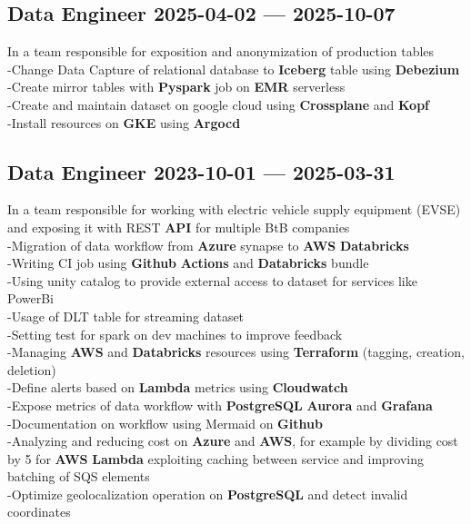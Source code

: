 \documentclass[10pt]{article}
\begin{document}
\subsection{{Data Engineer \hspace*{\fill} 2025-04-02 --- 2025-10-07}}
\smallskip
{}
\medskip
In a team responsible for exposition and anonymization of production tables\\
            -Change Data Capture of relational database to \textbf{Iceberg} table using \textbf{Debezium}\\
            -Create mirror tables with \textbf{Pyspark} job on \textbf{EMR} serverless\\
            -Create and maintain dataset on google cloud using \textbf{Crossplane} and \textbf{Kopf}\\
            -Install resources on \textbf{GKE} using \textbf{Argocd}
\medskip

\subsection{{Data Engineer \hspace*{\fill} 2023-10-01 --- 2025-03-31}}
\smallskip
{}
\medskip
In a team responsible for working with electric vehicle supply equipment (EVSE) and exposing
            it with REST \textbf{API} for multiple BtB companies\\
            -Migration of data workflow from \textbf{Azure} synapse to \textbf{AWS} \textbf{Databricks}\\
            -Writing CI job using \textbf{Github} \textbf{Actions} and \textbf{Databricks} bundle\\
            -Using unity catalog to provide external access to dataset for services like PowerBi\\
            -Usage of DLT table for streaming dataset\\
            -Setting test for spark on dev machines to improve feedback\\
            -Managing \textbf{AWS} and \textbf{Databricks} resources using \textbf{Terraform} (tagging, creation, deletion)\\
            -Define alerts based on \textbf{Lambda} metrics using \textbf{Cloudwatch}\\
            -Expose metrics of data workflow with \textbf{PostgreSQL} \textbf{Aurora} and \textbf{Grafana}\\
            -Documentation on workflow using Mermaid on \textbf{Github}\\
            -Analyzing and reducing cost on \textbf{Azure} and \textbf{AWS}, for example by  dividing cost by 5 for \textbf{AWS} \textbf{Lambda}
            exploiting caching between service and improving batching of SQS elements\\
            -Optimize geolocalization operation on \textbf{PostgreSQL} and detect invalid coordinates
\medskip
\end{document}
